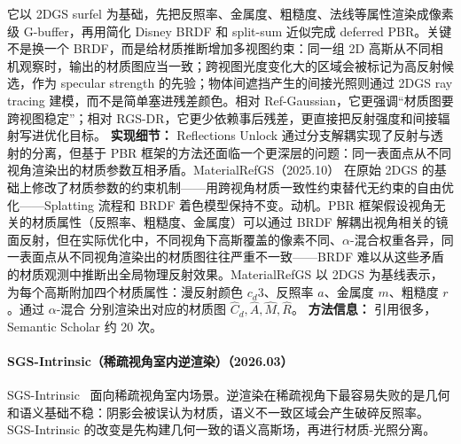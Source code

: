 它以 2DGS surfel 为基础，先把反照率、金属度、粗糙度、法线等属性渲染成像素级 G-buffer，再用简化 Disney BRDF 和 split-sum 近似完成 deferred PBR。关键不是换一个 BRDF，而是给材质推断增加多视图约束：同一组 2D 高斯从不同相机观察时，输出的材质图应当一致；跨视图光度变化大的区域会被标记为高反射候选，作为 specular strength 的先验；物体间遮挡产生的间接光照则通过 2DGS ray tracing 建模，而不是简单塞进残差颜色。相对 Ref-Gaussian，它更强调“材质图要跨视图稳定”；相对 RGS-DR，它更少依赖事后残差，更直接把反射强度和间接辐射写进优化目标。
\textbf{实现细节：} Reflections Unlock 通过分支解耦实现了反射与透射的分离，但基于 PBR 框架的方法还面临一个更深层的问题：同一表面点从不同视角渲染出的材质参数互相矛盾。MaterialRefGS（2025.10） 在原始 2DGS 的基础上修改了材质参数的约束机制——用跨视角材质一致性约束替代无约束的自由优化——Splatting 流程和 BRDF 着色模型保持不变。动机。PBR 框架假设视角无关的材质属性（反照率、粗糙度、金属度）可以通过 BRDF 解耦出视角相关的镜面反射，但在实际优化中，不同视角下高斯覆盖的像素不同、$\alpha$-混合权重各异，同一表面点从不同视角渲染出的材质图往往严重不一致——BRDF 难以从这些矛盾的材质观测中推断出全局物理反射效果。MaterialRefGS 以 2DGS 为基线表示，为每个高斯附加四个材质属性：漫反射颜色 $c_d^{}3$、反照率 $a$、金属度 $m$、粗糙度 $r$。通过 $\alpha$-混合 分别渲染出对应的材质图 $\hat{C}_d, \hat{A}, \hat{M}, \hat{R}$。
\textbf{方法信息：} 引用很多，Semantic Scholar 约 20 次。



\paragraph{SGS-Intrinsic（稀疏视角室内逆渲染）（2026.03）}
SGS-Intrinsic~\cite{2603_27516} 面向稀疏视角室内场景。逆渲染在稀疏视角下最容易失败的是几何和语义基础不稳：阴影会被误认为材质，语义不一致区域会产生破碎反照率。SGS-Intrinsic 的改变是先构建几何一致的语义高斯场，再进行材质-光照分离。

